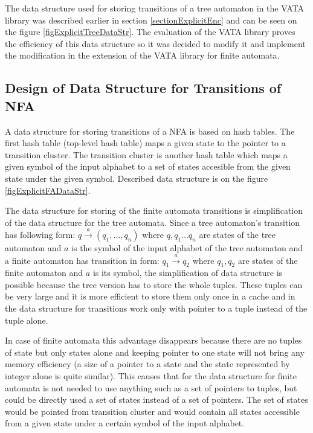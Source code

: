 The data structure used for storing transitions of a tree automaton in the VATA library was described earlier in section \ref{sectionExplicitEnc} and can be seen
on the figure \ref{figExplicitTreeDataStr}. The evaluation of the VATA library \cite{libvata} proves the efficiency of this data structure so it was
decided to modify it and implement the modification in the extension of the VATA library for finite automata.

\subsection{Design of Data Structure for Transitions of NFA}
A data structure for storing transitions of a NFA is based on hash tables. The first hash table (top-level hash table) maps a given state to the pointer to
a transition cluster. The transition cluster is another hash table which maps a given symbol of the input alphabet to a set of states accesible from
the given state under the given symbol. 
Described data structure is on the figure \ref{figExplicitFADataStr}.

The data structure for storing of the finite automata transitions is simplification of the data structure for the tree automata. Since a tree automaton's
transition has following form: $q \xrightarrow{a} (q_1,\ldots,q_n)$ where $q,q_1\ldots q_n$ are states of the tree automaton and $a$ is the symbol of 
the input alphabet of the tree automaton and a finite automaton has transition in form: $q_1 \xrightarrow{a} q_2$ 
where $q_1,q_2$ are states of the finite automaton and $a$ is its symbol, the simplification of data structure is possible because 
the tree version has to store the whole tuples. These tuples can be very large and it is more efficient to store them only once in a cache and 
in the data structure for transitions work only with pointer to a tuple instead of the tuple alone. 

In case of finite automata this advantage disappears because there are no tuples of state but only states alone and keeping pointer to one state will not 
bring any memory efficiency (a size of a pointer to a state and the state represented by integer alone is quite similar). This causes that for the data structure 
for finite automata is not needed to use anything such as a set of pointers to tuples, but could be directly used a set of states instead of
a set of pointers. The set of states would be pointed from transition cluster and would contain all states accessible from a given state under a 
certain symbol of the input alphabet.


